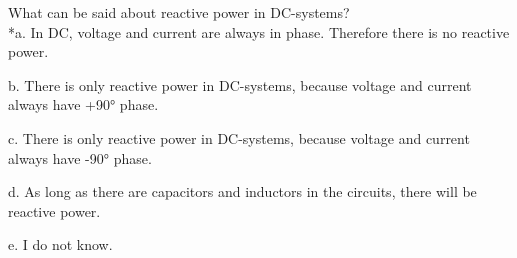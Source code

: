 
What can be said about reactive power in DC-systems?\\

*a. In DC, voltage and current are always in phase. Therefore there is no reactive power.

b. There is only reactive power in DC-systems, because voltage and current always have +90° phase.

c. There is only reactive power in DC-systems, because voltage and current always have -90° phase.

d. As long as there are capacitors and inductors in the circuits, there will be reactive power.

e. I do not know.\\
